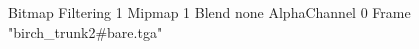 {Bitmap
	{Filtering 1}
	{Mipmap 1}
	{Blend none}
	{AlphaChannel 0}
	{Frame "birch_trunk2#bare.tga"}
}
